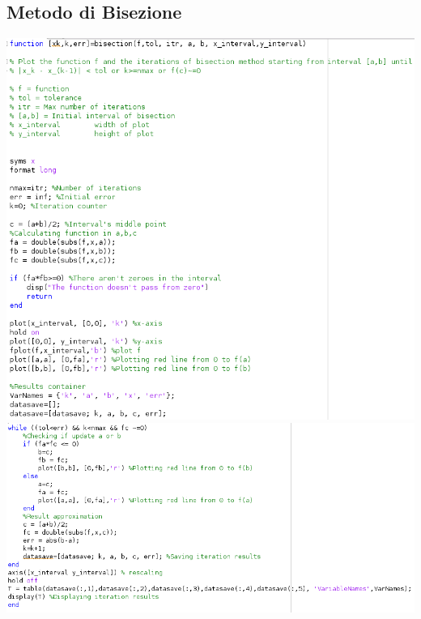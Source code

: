 \documentclass[12pt, letterpaper]{article}
\begin{document}
\subsection{Metodo di Bisezione}
\includegraphics[scale=0.78]{ProgrammaBisezione1.png}\\
\includegraphics[scale=0.78]{ProgrammaBisezione2.png}
\end{document}
